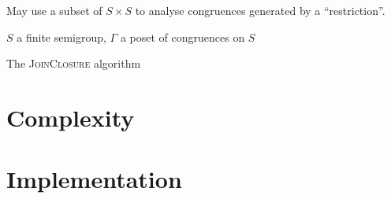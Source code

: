 May use a subset of $S \times S$ to analyse congruences generated by a
``restriction''.

\begin{algorithm}
    \Require $S$ a finite semigroup, $\Gamma$ a poset of congruences on $S$
  \caption{The \textsc{JoinClosure} algorithm}
  \label{alg:join-closure}
  \begin{algorithmic}[1]
    \EndProcedure
  \end{algorithmic}
\end{algorithm}

\section{Complexity}

\section{Implementation}
